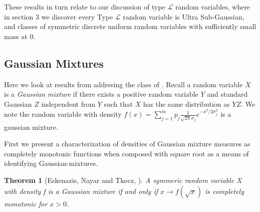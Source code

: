 \documentclass[10pt]{article}
\newcommand{\1}{\textbf{1}}
\newtheorem{theorem}{Theorem}[subsection]
\newtheorem{lemma}[theorem]{Lemma}
\theoremstyle{remark}
\theoremstyle{definition}
\begin{document}

These results in turn relate to our discussion of type $\mathcal{L}$ random variables, where in section 3 we discover every Type $\mathcal{L}$ random variable is Ultra Sub-Gaussian, and classes of symmetric discrete uniform random variables with sufficiently small mass at 0.







\subsection{Gaussian Mixtures}

Here we look at results from \cite{ENT} addresing the class of . Recall a random variable $X$ is a \textit{Gaussian mixture} if there exists a positive random variable $Y$ and standard Gaussian $Z$ independent from $Y$ such that $X$ has the same distribution as $YZ$. We note the random variable with density $f(x) = \sum_{j=1}^m p_j \frac{1}{\sqrt{2\pi}\sigma_j}e^{-x^2/2\sigma_j^2}$ is a gaussian mixture.

First we present a characterization of densities of Gaussian mixture measures as completely monotonic functions when composed with square root as a means of identifying Gaussian-mixtures.

\begin{theorem}[Eskenazis, Nayar and Tkocz, \cite{ENT}]\label{thm:ENT2}
	A symmeric random variable X with density f is a Gaussian mixture if and only if $x \to f(\sqrt{x})$ is completely monotonic for $x > 0$. 
\end{theorem}
\end{document}
